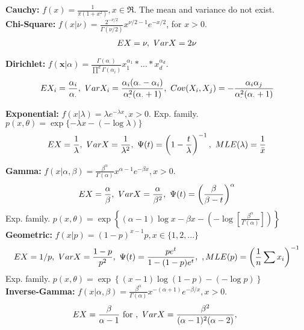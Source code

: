 \documentclass[11pt]{article}
\begin{document}
\noindent\textbf{Cauchy:} $f(x) = \frac{1}{\pi(1+x^2)},x \in \Re$. The mean and variance do not exist. \\

\noindent\textbf{Chi-Square:} $f(x|\nu) = \frac{2^{-\nu/2}}{\Gamma(\nu/2)}x^{\nu/2-1}e^{-x/2}$, for $x>0$.
\begin{eqnarray}
EX = \nu,\text{ }VarX = 2\nu
\notag\end{eqnarray}

\noindent\textbf{Dirichlet:} $f(\textbf{x}|\alpha) = \frac{\Gamma(\alpha_{\cdot})}{\prod^d\Gamma(\alpha_i)}x_1^{\alpha_1}*...*x_d^{\alpha_d}$.
\begin{eqnarray}
EX_i = \frac{\alpha_i}{\alpha_{\cdot}},\text{ }VarX_i = \frac{\alpha_i(\alpha_\cdot - \alpha_i)}{\alpha_\cdot^2(\alpha_\cdot+1)},\text{ }Cov(X_i,X_j) = -\frac{\alpha_i\alpha_j}{\alpha_\cdot^2(\alpha_\cdot+1)}
\notag\end{eqnarray}

\noindent\textbf{Exponential:} $f(x|\lambda) = \lambda e^{-\lambda x}, x>0$. Exp. family. $p(x,\theta) = \exp{\{ -\lambda x -(-\log{\lambda}) \}}$
\begin{eqnarray}
EX = \frac{1}{\lambda},\text{ }VarX = \frac{1}{\lambda^2},\text{ } \Psi(t) = \left( 1-\frac{t}{\lambda} \right)^{-1},\text{ }MLE(\lambda) = \frac{1}{\bar{x}} \notag
\end{eqnarray}

\noindent\textbf{Gamma:} $f(x|\alpha,\beta)=\frac{\beta^{\alpha}}{\Gamma(\alpha)}x^{\alpha-1}e^{-\beta x},x>0$.
\begin{eqnarray}
EX = \frac{\alpha}{\beta}, \text{ }VarX = \frac{\alpha}{\beta^2},\text{ } \Psi(t) = \left( \frac{\beta}{\beta-t} \right)^{\alpha} \notag
\end{eqnarray}
\indent Exp. family. $p(x,\theta) = \exp{\left\{ (\alpha-1)\log{x} -\beta x -\left(-\log{\left[\frac{\beta^{\alpha}}{\Gamma(\alpha)}\right]}\right) \right\}}$ \\

\noindent\textbf{Geometric:} $f(x|p) = (1-p)^{x-1}p, x \in \{1,2,...\}$ 
\begin{eqnarray}
EX = 1/p, \text{ }VarX = \frac{1-p}{p^2},\text{ }\Psi(t) = \frac{pe^t}{1-(1-p)e^t},\text{ },MLE(p) = \left(\frac{1}{n}\sum{x_i}\right)^{-1} \notag
\end{eqnarray}
\indent Exp. family. $p(x,\theta) = \exp{\left\{ (x-1)\log{(1-p)} - (-\log{p}) \right\}}$ \\

\noindent\textbf{Inverse-Gamma:} $f(x|\alpha,\beta)=\frac{\beta^{\alpha}}{\Gamma(\alpha)}x^{-(\alpha+1)}e^{-\beta/x},x>0$.
\begin{eqnarray}
EX = \frac{\beta}{\alpha-1}\text{ for }, \text{ }VarX = \frac{\beta^2}{(\alpha-1)^2(\alpha-2)},\text{ }
\notag\end{eqnarray}
\end{document}
